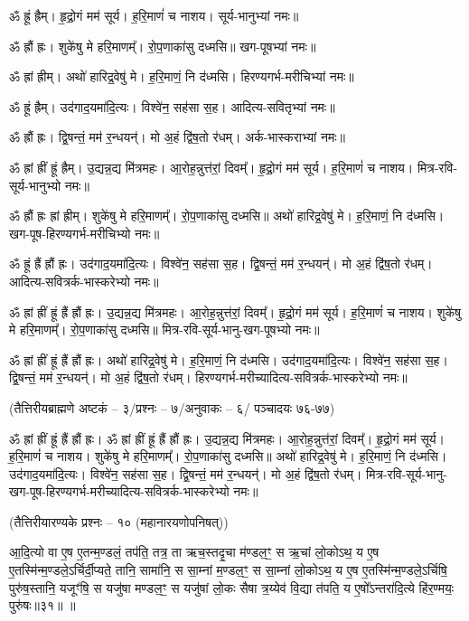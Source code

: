 ॐ ह्रूं ह्रैम्। हृ॒द्रो॒गं मम॑ सूर्य। ह॒रि॒माणं॑ च नाशय। सूर्य-भानुभ्यां नमः॥

ॐ ह्रौं ह्रः। शुके॑षु मे हरि॒माणम्᳚। रो॒प॒णाका॑सु दध्मसि॥ खग-पूषभ्यां नमः॥

ॐ ह्रां ह्रीम्। अथो॑ हारिद्र॒वेषु॑ मे। ह॒रि॒माणं॒ नि द॑ध्मसि। हिरण्यगर्भ-मरीचिभ्यां नमः॥

ॐ ह्रूं ह्रैम्। उद॑गाद॒यमा॑दि॒त्यः। विश्वे॑न॒ सह॑सा स॒ह। आदित्य-सवितृभ्यां नमः॥

ॐ ह्रौं ह्रः। द्वि॒षन्तं॒ मम॑ र॒न्धयन्॑। मो अ॒हं द्वि॑ष॒तो र॑धम्। अर्क-भास्कराभ्यां नमः॥

ॐ ह्रां ह्रीं ह्रूं ह्रैम्। उ॒द्यन्न॒द्य मि॑त्रमहः। आ॒रोह॒न्नुत्त॑रां॒ दिवम्᳚। हृ॒द्रो॒गं मम॑ सूर्य। ह॒रि॒माणं॑ च नाशय। मित्र-रवि-सूर्य-भानुभ्यो नमः॥

ॐ ह्रौं ह्रः ह्रां ह्रीम्। शुके॑षु मे हरि॒माणम्᳚। रो॒प॒णाका॑सु दध्मसि॥ अथो॑ हारिद्र॒वेषु॑ मे। ह॒रि॒माणं॒ नि द॑ध्मसि। खग-पूष-हिरण्यगर्भ-मरीचिभ्यो नमः॥

ॐ ह्रूं ह्रैं ह्रौं ह्रः। उद॑गाद॒यमा॑दि॒त्यः। विश्वे॑न॒ सह॑सा स॒ह। द्वि॒षन्तं॒ मम॑ र॒न्धयन्॑। मो अ॒हं द्वि॑ष॒तो र॑धम्। आदित्य-सवित्रर्क-भास्करेभ्यो नमः॥

ॐ ह्रां ह्रीं ह्रूं ह्रैं ह्रौं ह्रः।
उ॒द्यन्न॒द्य मि॑त्रमहः। आ॒रोह॒न्नुत्त॑रां॒ दिवम्᳚। हृ॒द्रो॒गं मम॑ सूर्य। ह॒रि॒माणं॑ च नाशय। शुके॑षु मे हरि॒माणम्᳚। रो॒प॒णाका॑सु दध्मसि॥
मित्र-रवि-सूर्य-भानु-खग-पूषभ्यो नमः॥

ॐ ह्रां ह्रीं ह्रूं ह्रैं ह्रौं ह्रः।
अथो॑ हारिद्र॒वेषु॑ मे। ह॒रि॒माणं॒ नि द॑ध्मसि। उद॑गाद॒यमा॑दि॒त्यः। विश्वे॑न॒ सह॑सा स॒ह। द्वि॒षन्तं॒ मम॑ र॒न्धयन्॑। मो अ॒हं द्वि॑ष॒तो र॑धम्।
हिरण्यगर्भ-मरीच्यादित्य-सवित्रर्क-भास्करेभ्यो नमः॥

\centerline{\normalsize (तैत्तिरीयब्राह्मणे अष्टकं – ३/प्रश्नः – ७/अनुवाकः – ६/ पञ्चादयः ७६-७७)}

ॐ ह्रां ह्रीं ह्रूं ह्रैं ह्रौं ह्रः। ॐ ह्रां ह्रीं ह्रूं ह्रैं ह्रौं ह्रः।
उ॒द्यन्न॒द्य मि॑त्रमहः।
आ॒रोह॒न्नुत्त॑रां॒ दिवम्᳚।
हृ॒द्रो॒गं मम॑ सूर्य।
ह॒रि॒माणं॑ च नाशय।
शुके॑षु मे हरि॒माणम्᳚।
रो॒प॒णाका॑सु दध्मसि॥
अथो॑ हारिद्र॒वेषु॑ मे।
ह॒रि॒माणं॒ नि द॑ध्मसि।
उद॑गाद॒यमा॑दि॒त्यः।
विश्वे॑न॒ सह॑सा स॒ह।
द्वि॒षन्तं॒ मम॑ र॒न्धयन्॑।
मो अ॒हं द्वि॑ष॒तो र॑धम्।
मित्र-रवि-सूर्य-भानु-खग-पूष-हिरण्यगर्भ-मरीच्यादित्य-सवित्रर्क-भास्करेभ्यो नमः॥

\centerline{\normalsize (तैत्तिरीयारण्यके प्रश्नः – १० (महानारयणोपनिषत्))}
आ॒दि॒त्यो वा ए॒ष ए॒तन्म॒ण्डलं॒ तप॑ति॒ तत्र॒ ता ऋच॒स्तदृ॒चा म॑ण्डल॒ꣳ॒ स ऋ॒चां लो॒कोऽथ॒ य ए॒ष ए॒तस्मि॑न्म॒ण्डले॒ऽर्चिर्दी॒प्यते॒ तानि॒ सामा॑नि॒ स सा॒म्नां म॒ण्डल॒ꣳ॒ स सा॒म्नां लो॒कोऽथ॒ य ए॒ष ए॒तस्मि॑न्म॒ण्डले॒ऽर्चिषि॒ पुरु॑ष॒स्तानि॒ यजूꣳ॑षि॒ स यजु॑षा मण्डल॒ꣳ॒ स यजु॑षां लो॒कः सैषा त्र॒य्येव॑ वि॒द्या त॑पति॒ य ए॒षो᳚ऽन्तरा॑दि॒त्ये हि॑र॒ण्मयः॒ पुरु॑षः॥३१॥
\devAya{}॥

